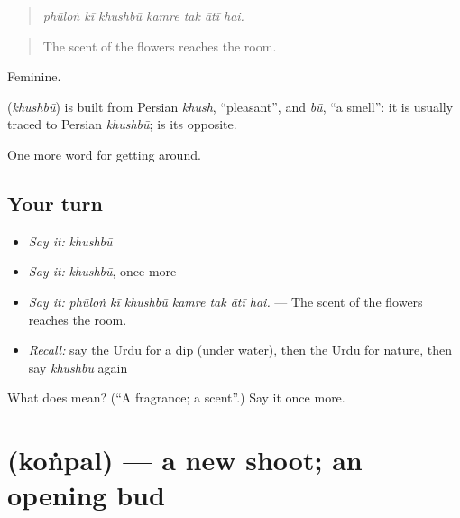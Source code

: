 \begin{quote}
      
\end{quote}

\begin{quote}
\emph{phūloṅ kī khushbū kamre tak ātī hai.}
\end{quote}

\begin{quote}
The scent of the flowers reaches the room.
\end{quote}

Feminine.

\begin{cousinweb}
\textbf{} (\emph{khushbū}) is built from Persian \emph{khush}, \textquotedblleft{}pleasant\textquotedblright{}, and \emph{bū}, \textquotedblleft{}a smell\textquotedblright{}: it is usually traced to Persian \emph{khushbū}; \textbf{} is its opposite.
\end{cousinweb}

\begin{grammarlens}[title={What you've built}]
One more word for getting around.
\end{grammarlens}

\subsection*{Your turn}
\begin{itemize}
\raggedright
  \item \emph{Say it:} \emph{khushbū}
  \item \emph{Say it:} \emph{khushbū}, once more
  \item \emph{Say it:} \emph{phūloṅ kī khushbū kamre tak ātī hai.} — The scent of the flowers reaches the room.
  \item \emph{Recall:} say the Urdu for a dip (under water), then the Urdu for nature, then say \emph{khushbū} again
\end{itemize}

\begin{tcolorbox}[breakable,colback=teal!4,colframe=teal!35!black,title={Before you move on}]
What does  mean? (\textquotedblleft{}A fragrance; a scent\textquotedblright{}.) Say it once more.
\end{tcolorbox}
\section[\texorpdfstring{\ur{کونپل} (koṅpal)}{کونپل (koṅpal)}]{ (koṅpal) — a new shoot; an opening bud}

